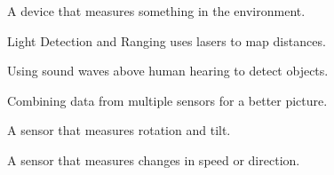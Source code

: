 \sectionrule
\begin{newwords}
  \begin{description}[labelwidth=3.8cm, leftmargin=4.0cm]
    \item[Sensor] A device that measures something in the environment.
    \item[Lidar] Light Detection and Ranging \textemdash{} uses lasers to map distances.
    \item[Ultrasonic] Using sound waves above human hearing to detect objects.
    \item[Sensor fusion] Combining data from multiple sensors for a better picture.
    \item[Gyroscope] A sensor that measures rotation and tilt.
    \item[Accelerometer] A sensor that measures changes in speed or direction.
  \end{description}
\end{newwords}
